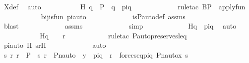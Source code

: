 \begin{isabellebody}
\ X{\isacharunderscore}{\kern0pt}def\ \isamarkupfalse%
\ auto\ \isanewline
\ \ \ \ \ \ \ \ \isamarkupfalse%
\ H{\isacharcolon}{\kern0pt}\ {\isachardoublequoteopen}q\ {\isasymin}\ P\ {\isasymand}\ {\isasympi}{\isacharbackquote}{\kern0pt}q\ {\isacharequal}{\kern0pt}\ piq{\isachardoublequoteclose}\ \isanewline
\ \ \ \ \ \ \ \ \ \ \isamarkupfalse%
\ {\isacharparenleft}{\kern0pt}rule{\isacharunderscore}{\kern0pt}tac\ B{\isacharequal}{\kern0pt}{\isachardoublequoteopen}{\isasymlambda}{\isacharunderscore}{\kern0pt}{\isachardot}{\kern0pt}P{\isachardoublequoteclose}\ \ apply{\isacharunderscore}{\kern0pt}fun{\isacharparenright}{\kern0pt}\ \isanewline
\ \ \ \ \ \ \ \ \ \ \isamarkupfalse%
\ bij{\isacharunderscore}{\kern0pt}is{\isacharunderscore}{\kern0pt}fun\ piauto\ \isanewline
\ \ \ \ \ \ \ \ \ \ \isamarkupfalse%
\ is{\isacharunderscore}{\kern0pt}P{\isacharunderscore}{\kern0pt}auto{\isacharunderscore}{\kern0pt}def\ assms\ \isanewline
\ \ \ \ \ \ \ \ \ \ \ \isamarkupfalse%
\ blast\ \isanewline
\ \ \ \ \ \ \ \ \ \ \isamarkupfalse%
\ assms\ \isanewline
\ \ \ \ \ \ \ \ \ \ \isamarkupfalse%
\ simp\ \isanewline
\ \ \ \ \ \ \ \ \isamarkupfalse%
\ \isamarkupfalse%
\ H{}{\isacharcolon}{\kern0pt}{\isachardoublequoteopen}{\isasympi}{\isacharbackquote}{\kern0pt}q\ {\isacharequal}{\kern0pt}\ piq{\isachardoublequoteclose}\ \isamarkupfalse%
\ auto\ \isanewline
\ \ \ \ \ \ \ \ \isamarkupfalse%
\ \isamarkupfalse%
\ H{}{\isacharcolon}{\kern0pt}{\isachardoublequoteopen}{\isasympi}{\isacharbackquote}{\kern0pt}q\ {\isasympreceq}\ {\isasympi}\ {\isacharbackquote}{\kern0pt}\ r{\isachardoublequoteclose}\isanewline
\ \ \ \ \ \ \ \ \ \ \isamarkupfalse%
\ {\isacharparenleft}{\kern0pt}rule{\isacharunderscore}{\kern0pt}tac\ P{\isacharunderscore}{\kern0pt}auto{\isacharunderscore}{\kern0pt}preserves{\isacharunderscore}{\kern0pt}leq{\isacharparenright}{\kern0pt}\isanewline
\ \ \ \ \ \ \ \ \ \ \isamarkupfalse%
\ piauto\ H\ srH\ \isanewline
\ \ \ \ \ \ \ \ \ \ \isamarkupfalse%
\ auto\ \isanewline
\ \ \ \ \ \ \ \ \isamarkupfalse%
\ {\isachardoublequoteopen}{\isasymexists}s\ r{\isachardot}{\kern0pt}\ r\ {\isasymin}\ P\ {\isasymand}\ {\isasymlangle}s{\isacharcomma}{\kern0pt}\ r{\isasymrangle}\ {\isasymin}\ Pn{\isacharunderscore}{\kern0pt}auto{\isacharparenleft}{\kern0pt}{\isasympi}{\isacharparenright}{\kern0pt}\ {\isacharbackquote}{\kern0pt}\ y\ {\isasymand}\ piq\ {\isasympreceq}\ r\ {\isasymand}\ forces{\isacharunderscore}{\kern0pt}eq{\isacharparenleft}{\kern0pt}piq{\isacharcomma}{\kern0pt}\ Pn{\isacharunderscore}{\kern0pt}auto{\isacharparenleft}{\kern0pt}{\isasympi}{\isacharparenright}{\kern0pt}{\isacharbackquote}{\kern0pt}x{\isacharcomma}{\kern0pt}\ s{\isacharparenright}{\kern0pt}{\isachardoublequoteclose}\isanewline

\end{isabellebody}
